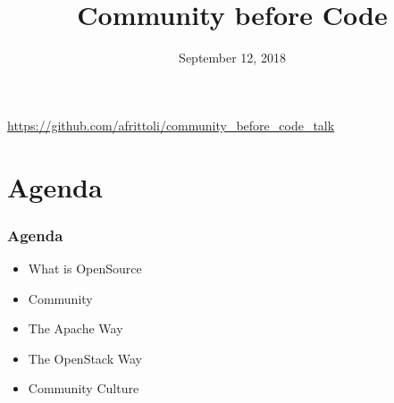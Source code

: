 \documentclass[aspectratio=169,11pt,hyperref={colorlinks=true}]{beamer}
\author[Andrea]{%
   \texorpdfstring{
       \begin{columns}
           \column{.45\linewidth}
           \centering
           Andrea Frittoli\\
           ~\\
           Developer Advocate @ IBM
           \href{mailto:andrea.frittoli@gmail.com}{andrea.frittoli@gmail.com}\\
           @blackchip76\\
       \end{columns}
  }
  {Andrea Frittoli}
}
\date{September 12, 2018}
\title[Community before Code
\hspace{2em}\insertframenumber/\inserttotalframenumber]{Community before Code}
\begin{document}
{
\begin{frame}[noframenumbering]
    \hypersetup{colorlinks,urlcolor=white}
    \titlepage{}
    \centering
    \href{https://github.com/afrittoli/community\_before\_code\_talk}{https://github.com/afrittoli/community\_before\_code\_talk}
\end{frame}
}

\section{Agenda}
\begin{frame}
  \frametitle{Agenda}
    \begin{itemize}
        \item{What is OpenSource}
        \item{Community}
        \item{The Apache Way}
        \item{The OpenStack Way}
        \item{Community Culture}
    \end{itemize}
\end{frame}

\end{document}
